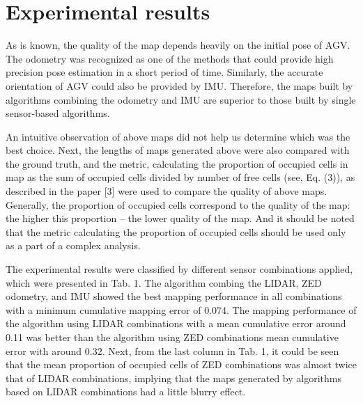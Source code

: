 \documentclass[english]{article}
\begin{document}

\section{Experimental results}
As is known, the quality of the map depends heavily on the initial pose of AGV. The odometry was recognized
as one of the methods that could provide high precision pose estimation in a short period of time. Similarly, the accurate orientation of AGV could also be provided by IMU. Therefore, the maps built by algorithms combining the odometry and IMU are superior to those built by single sensor-based algorithms.

An intuitive observation of above maps did not help us determine which was the best choice. Next, the lengths of maps generated above were also compared with the ground truth, and the metric, calculating the proportion of occupied cells in map as the sum of occupied cells divided by number of free cells (see, Eq. (3)), as described in the paper [3] were used to compare the quality of above maps. Generally, the proportion of occupied cells correspond to the quality of the map: the higher this proportion – the lower quality of the map. And it should be noted that the metric calculating the proportion of occupied cells should be used only as a part of a complex analysis.


The experimental results were classified by different sensor combinations applied, which were presented in
Tab. 1. The algorithm combing the LIDAR, ZED odometry, and IMU showed the best mapping performance in
all combinations with a minimum cumulative mapping error of 0.074. The mapping performance of the algorithm
using LIDAR combinations with a mean cumulative error around 0.11 was better than the algorithm using ZED
combinations mean cumulative error with around 0.32. Next, from the last column in Tab. 1, it could be seen
that the mean proportion of occupied cells of ZED combinations was almost twice that of LIDAR combinations,
implying that the maps generated by algorithms based on LIDAR combinations had a little blurry effect.

{\small


}
\end{document}

